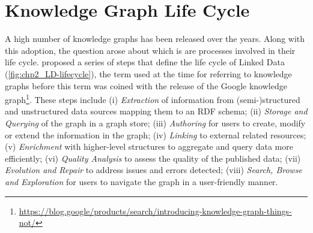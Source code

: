 \section{Knowledge Graph Life Cycle }
\label{sec:chp2_kg_lifecycle}





A high number of knowledge graphs has been released over the years. Along with this adoption, the question arose about which is are processes involved in their life cycle.
\cite{ngomo2014LD-lifecycle} proposed a series of steps that define the life cycle of Linked Data (\cref{fig:chp2_LD-lifecycle}), the term used at the time for referring to knowledge graphs before this term was coined with the release of the Google knowledge graph\footnote{\url{https://blog.google/products/search/introducing-knowledge-graph-things-not/}}. 
These steps include 
(i) \textit{Extraction} of information from (semi-)structured and unstructured data sources mapping them to an RDF schema; 
(ii) \textit{Storage and Querying} of the graph in a graph store; 
(iii) \textit{Authoring} for users to create, modify or extend the information in the graph;
(iv) \textit{Linking} to external related resources;
(v) \textit{Enrichment} with higher-level structures to aggregate and query data more efficiently;
(vi) \textit{Quality Analysis} to assess the quality of the published data;
(vii) \textit{Evolution and Repair} to address issues and errors detected;
(viii) \textit{Search, Browse and Exploration} for users to navigate the graph in a user-friendly manner. 

